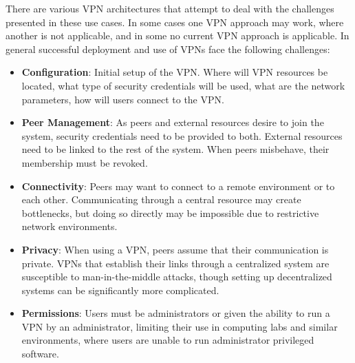 There are various VPN architectures that attempt to deal with the challenges
presented in these use cases.  In some cases one VPN approach may work,
where another is not applicable, and in some no current VPN approach is
applicable.  In general successful deployment and use of VPNs face the
following challenges:  
\begin{itemize}
\item \textbf{Configuration}:  Initial setup of the VPN.  Where will VPN
resources be located, what type of security credentials will be used, what are
the network parameters, how will users connect to the VPN.
\item \textbf{Peer Management}:  As peers and external resources desire to join
the system, security credentials need to be provided to both.  External
resources need to be linked to the rest of the system.  When peers misbehave,
their membership must be revoked.
\item \textbf{Connectivity}:  Peers may want to connect to a remote environment
or to each other.  Communicating through a central resource may create
bottlenecks, but doing so directly may be impossible due to restrictive network
environments.
\item \textbf{Privacy}:  When using a VPN, peers assume that their communication
is private.  VPNs that establish their links through a centralized system are
susceptible to man-in-the-middle attacks, though setting up decentralized
systems can be significantly more complicated.
\item \textbf{Permissions}:  Users must be administrators or given the ability
to run a VPN by an administrator, limiting their use in computing labs and
similar environments, where users are unable to run administrator privileged
software.
\end{itemize}


